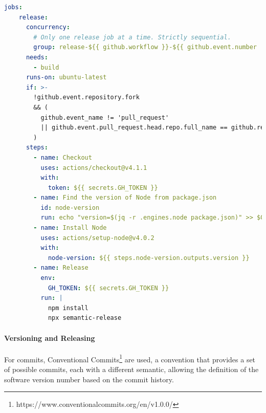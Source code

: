 \documentclass[12pt,a4paper,openright,twoside]{book}
\begin{document}
\begin{lstlisting}[language=yaml, label={lst:ci-release}, caption={CI/CD workflow: release job.}]
  jobs:
    release:
      concurrency:
        # Only one release job at a time. Strictly sequential.
        group: release-${{ github.workflow }}-${{ github.event.number || github.ref }}
      needs:
        - build
      runs-on: ubuntu-latest
      if: >-
        !github.event.repository.fork
        && (
          github.event_name != 'pull_request'
          || github.event.pull_request.head.repo.full_name == github.repository
        )
      steps:
        - name: Checkout
          uses: actions/checkout@v4.1.1
          with:
            token: ${{ secrets.GH_TOKEN }}
        - name: Find the version of Node from package.json
          id: node-version
          run: echo "version=$(jq -r .engines.node package.json)" >> $GITHUB_OUTPUT
        - name: Install Node
          uses: actions/setup-node@v4.0.2
          with:
            node-version: ${{ steps.node-version.outputs.version }}
        - name: Release
          env:
            GH_TOKEN: ${{ secrets.GH_TOKEN }}
          run: |
            npm install
            npx semantic-release
  \end{lstlisting}

\paragraph*{Versioning and Releasing}
For commits, Conventional Commits\footnote{https://www.conventionalcommits.org/en/v1.0.0/} are used, a convention that provides a set of possible commits, 
each with a different semantic, allowing the definition of the software version number based on the commit history.
\end{document}
